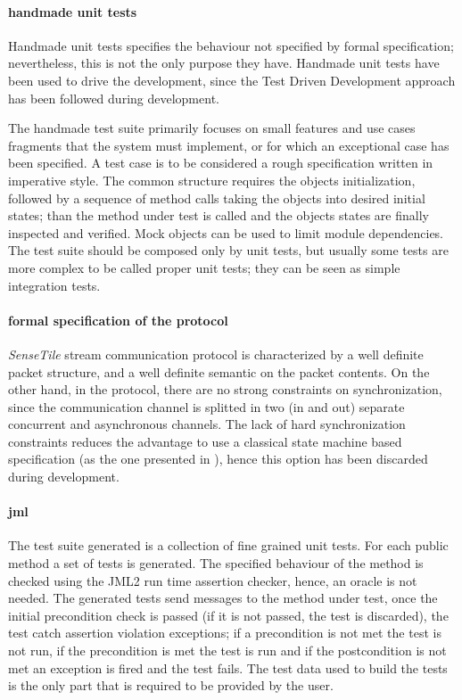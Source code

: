 \documentclass[english]{lni}
\newcommand{\ST}{\emph{SenseTile}\xspace}
\begin{document}
\paragraph*{handmade unit tests}

Handmade unit tests specifies the behaviour not specified by formal specification; nevertheless, this is not the only purpose they have.
Handmade unit tests have been used to drive the development, since the Test Driven Development approach\cite{Beck2003} has been
followed during development.

The handmade test suite primarily focuses on small features and use cases fragments that the system must implement, or for which an exceptional case has been specified. 
A test case is to be considered a rough specification written in imperative style. 
The common structure requires the objects initialization, followed by a sequence of method calls taking the objects into desired initial states; than the method under test is called and the objects states are finally inspected and verified. 
Mock objects can be used to limit module dependencies. 
The test suite should be composed only by unit tests, but usually some tests are more complex to be called proper unit tests; they can be seen as simple integration tests.


\paragraph{formal specification of the protocol}

\ST stream communication protocol is characterized by a well definite packet structure, and a well definite semantic on the packet contents.  
On the other hand, in the protocol, there are no strong constraints on synchronization, since the communication channel is splitted in two (in and out) separate concurrent and asynchronous channels.
The lack of hard synchronization constraints reduces the advantage to use a classical state machine based specification (as the one presented in \cite{Hubbers2004}), hence this option has been discarded during development.

\paragraph{jml}

The test suite generated is a collection of fine grained unit tests.
For each public method a set of tests is generated.
The specified behaviour of the method is checked using the JML2 run time assertion checker, hence, an oracle is not needed.  
The generated tests send messages to the method under test, once the initial precondition check is passed (if it is not passed, the test is discarded), the test catch assertion violation exceptions; if a precondition is not met the test is not run, if the precondition is met the test is run and if the postcondition is not met an exception is fired and the test fails.
The test data used to build the tests is the only part that is required to be provided by the user.
\end{document}
